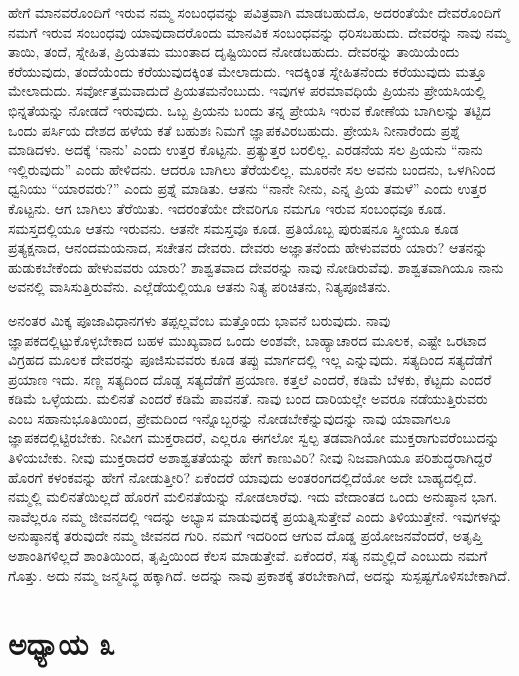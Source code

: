 \vskip 5pt

ಹೇಗೆ ಮಾನವರೊಂದಿಗೆ ಇರುವ ನಮ್ಮ ಸಂಬಂಧವನ್ನು ಪವಿತ್ರವಾಗಿ ಮಾಡಬಹುದೊ, ಅದರಂತೆಯೇ ದೇವರೊಂದಿಗೆ ನಮಗೆ ಇರುವ ಸಂಬಂಧವು ಯಾವುದಾದರೊಂದು ಮಾನವಿಕ ಸಂಬಂಧವನ್ನು ಧರಿಸಬಹುದು. ದೇವರನ್ನು ನಾವು ನಮ್ಮ ತಾಯಿ, ತಂದೆ, ಸ್ನೇಹಿತ, ಪ್ರಿಯತಮ ಮುಂತಾದ ದೃಷ್ಟಿಯಿಂದ ನೋಡಬಹುದು. ದೇವರನ್ನು ತಾಯಿಯೆಂದು ಕರೆಯುವುದು, ತಂದೆಯೆಂದು ಕರೆಯುವುದಕ್ಕಿಂತ ಮೇಲಾದುದು. ಇದಕ್ಕಿಂತ ಸ್ನೇಹಿತನೆಂದು ಕರೆಯುವುದು ಮತ್ತೂ ಮೇಲಾದುದು. ಸರ್ವೋತ್ತಮವಾದುದೆ ಪ್ರಿಯತಮನೆಂಬುದು. ಇವುಗಳ ಪರಮಾವಧಿಯೆ ಪ್ರಿಯನು ಪ್ರೇಯಸಿಯಲ್ಲಿ ಭಿನ್ನತೆಯನ್ನು ನೋಡದೆ ಇರುವುದು. ಒಬ್ಬ ಪ್ರಿಯನು ಬಂದು ತನ್ನ ಪ್ರೇಯಸಿ ಇರುವ ಕೋಣೆಯ ಬಾಗಿಲನ್ನು ತಟ್ಟಿದ ಒಂದು ಪರ್ಸಿಯ ದೇಶದ ಹಳೆಯ ಕತೆ ಬಹುಶಃ ನಿಮಗೆ ಜ್ಞಾಪಕವಿರಬಹುದು. ಪ್ರೇಯಸಿ ನೀನಾರೆಂದು ಪ್ರಶ್ನೆ ಮಾಡಿದಳು. ಅದಕ್ಕೆ ‘ನಾನು’ ಎಂದು ಉತ್ತರ ಕೊಟ್ಟನು. ಪ್ರತ್ಯುತ್ತರ ಬರಲಿಲ್ಲ. ಎರಡನೆಯ ಸಲ ಪ್ರಿಯನು “ನಾನು ಇಲ್ಲಿರುವುದು” ಎಂದು ಹೇಳಿದನು. ಆದರೂ ಬಾಗಿಲು ತೆರೆಯಲಿಲ್ಲ. ಮೂರನೇ ಸಲ ಅವನು ಬಂದನು, ಒಳಗಿನಿಂದ ಧ್ವನಿಯು “ಯಾರವರು?” ಎಂದು ಪ್ರಶ್ನೆ ಮಾಡಿತು. ಆತನು “ನಾನೇ ನೀನು, ಎನ್ನ ಪ್ರಿಯ ತಮಳೆ” ಎಂದು ಉತ್ತರ ಕೊಟ್ಟನು. ಆಗ ಬಾಗಿಲು ತೆರೆಯಿತು. ಇದರಂತೆಯೇ ದೇವರಿಗೂ ನಮಗೂ ಇರುವ ಸಂಬಂಧವೂ ಕೂಡ. ಸಮಸ್ತದಲ್ಲಿಯೂ ಆತನು ಇರುವನು. ಆತನೇ ಸಮಸ್ತವೂ ಕೂಡ. ಪ್ರತಿಯೊಬ್ಬ ಪುರುಷನೂ ಸ್ತ್ರೀಯೂ ಕೂಡ ಪ್ರತ್ಯಕ್ಷನಾದ, ಆನಂದಮಯನಾದ, ಸಚೇತನ ದೇವರು. ದೇವರು ಅಜ್ಞಾತನೆಂದು ಹೇಳುವವರು ಯಾರು? ಆತನನ್ನು ಹುಡುಕಬೇಕೆಂದು ಹೇಳುವವರು ಯಾರು? ಶಾಶ್ವತವಾದ ದೇವರನ್ನು ನಾವು ನೋಡಿರುವೆವು. ಶಾಶ್ವತವಾಗಿಯೂ ನಾನು ಅವನಲ್ಲಿ ವಾಸಿಸುತ್ತಿರುವೆನು. ಎಲ್ಲೆಡೆಯಲ್ಲಿಯೂ ಆತನು ನಿತ್ಯ ಪರಿಚಿತನು, ನಿತ್ಯಪೂಜಿತನು. 

ಅನಂತರ ಮಿಕ್ಕ ಪೂಜಾವಿಧಾನಗಳು ತಪ್ಪಲ್ಲವೆಂಬ ಮತ್ತೊಂದು ಭಾವನೆ ಬರುವುದು. ನಾವು ಜ್ಞಾಪಕದಲ್ಲಿಟ್ಟುಕೊಳ್ಳಬೇಕಾದ ಬಹಳ ಮುಖ್ಯವಾದ ಒಂದು ಅಂಶವೇ, ಬಾಹ್ಯಾಚಾರದ ಮೂಲಕ, ಎಷ್ಟೇ ಒರಟಾದ ವಿಗ್ರಹದ ಮೂಲಕ ದೇವರನ್ನು ಪೂಜಿಸುವವರು ಕೂಡ ತಪ್ಪು ಮಾರ್ಗದಲ್ಲಿ ಇಲ್ಲ ಎನ್ನುವುದು. ಸತ್ಯದಿಂದ ಸತ್ಯದೆಡೆಗೆ ಪ್ರಯಾಣ ಇದು. ಸಣ್ಣ ಸತ್ಯದಿಂದ ದೊಡ್ಡ ಸತ್ಯದೆಡೆಗೆ ಪ್ರಯಾಣ. ಕತ್ತಲೆ ಎಂದರೆ, ಕಡಿಮೆ ಬೆಳಕು, ಕೆಟ್ಟದು ಎಂದರೆ ಕಡಿಮೆ ಒಳ್ಳೆಯದು. ಮಲಿನತೆ ಎಂದರೆ ಕಡಿಮೆ ಪಾವನತೆ. ನಾವು ಬಂದ ದಾರಿಯಲ್ಲೇ ಅವರೂ ನಡೆಯುತ್ತಿರುವರು ಎಂಬ ಸಹಾನುಭೂತಿಯಿಂದ, ಪ್ರೇಮದಿಂದ ಇನ್ನೊಬ್ಬರನ್ನು ನೋಡಬೇಕೆನ್ನುವುದನ್ನು ನಾವು ಯಾವಾಗಲೂ ಜ್ಞಾಪಕದಲ್ಲಿಟ್ಟಿರಬೇಕು. ನೀವೀಗ ಮುಕ್ತರಾದರೆ, ಎಲ್ಲರೂ ಈಗಲೋ ಸ್ವಲ್ಪ ತಡವಾಗಿಯೋ ಮುಕ್ತರಾಗುವರೆಂಬುದನ್ನು ತಿಳಿಯಬೇಕು. ನೀವು ಮುಕ್ತರಾದರೆ ಅಶಾಶ್ವತತೆಯನ್ನು ಹೇಗೆ ಕಾಣುವಿರಿ? ನೀವು ನಿಜವಾಗಿಯೂ ಪರಿಶುದ್ಧರಾಗಿದ್ದರೆ ಹೊರಗೆ ಕಳಂಕವನ್ನು ಹೇಗೆ ನೋಡುತ್ತೀರಿ? ಏಕೆಂದರೆ ಯಾವುದು ಅಂತರಂಗದಲ್ಲಿದೆಯೋ ಅದೇ ಬಾಹ್ಯದಲ್ಲಿದೆ. ನಮ್ಮಲ್ಲಿ ಮಲಿನತೆಯಿಲ್ಲದೆ ಹೊರಗೆ ಮಲಿನತೆಯನ್ನು ನೋಡಲಾರೆವು. ಇದು ವೇದಾಂತದ ಒಂದು ಅನುಷ್ಠಾನ ಭಾಗ. ನಾವೆಲ್ಲರೂ ನಮ್ಮ ಜೀವನದಲ್ಲಿ ಇದನ್ನು ಅಭ್ಯಾಸ ಮಾಡುವುದಕ್ಕೆ ಪ್ರಯತ್ನಿಸುತ್ತೇವೆ ಎಂದು ತಿಳಿಯುತ್ತೇನೆ. ಇವುಗಳನ್ನು ಅನುಷ್ಠಾನಕ್ಕೆ ತರುವುದೇ ನಮ್ಮ ಜೀವನದ ಗುರಿ. ನಮಗೆ ಇದರಿಂದ ಆಗುವ ದೊಡ್ಡ ಪ್ರಯೋಜನವೆಂದರೆ, ಅತೃಪ್ತಿ ಅಶಾಂತಿಗಳಿಲ್ಲದೆ ಶಾಂತಿಯಿಂದ, ತೃಪ್ತಿಯಿಂದ ಕೆಲಸ ಮಾಡುತ್ತೇವೆ. ಏಕೆಂದರೆ, ಸತ್ಯ ನಮ್ಮಲ್ಲಿದೆ ಎಂಬುದು ನಮಗೆ ಗೊತ್ತು. ಅದು ನಮ್ಮ ಜನ್ಮಸಿದ್ಧ ಹಕ್ಕಾಗಿದೆ. ಅದನ್ನು ನಾವು ಪ್ರಕಾಶಕ್ಕೆ ತರಬೇಕಾಗಿದೆ, ಅದನ್ನು ಸುಸ್ಪಷ್ಟಗೊಳಿಸಬೇಕಾಗಿದೆ.

\chapter{ಅಧ್ಯಾಯ ೩}

